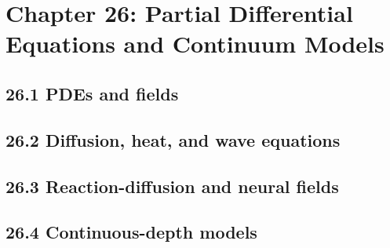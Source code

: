 \section{Chapter 26: Partial Differential Equations and Continuum Models}

\subsection{26.1 PDEs and fields}

\subsection{26.2 Diffusion, heat, and wave equations}

\subsection{26.3 Reaction-diffusion and neural fields}

\subsection{26.4 Continuous-depth models}

\clearpage
